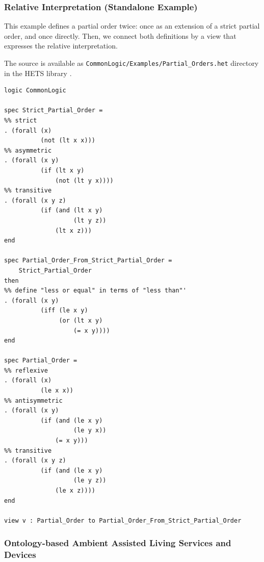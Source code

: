 \documentclass{article}
\newcommand{\normalTEXTSC}[2]{{#1\scriptsize#2}}
\newcommand     {\Hets}{\normalTEXTSC{H}{ETS}\xspace}
\begin{document}
\subsubsection{Relative Interpretation (Standalone Example)}\label{sec:rel-intpr-standalone}

This example defines a partial order twice: once as an extension of a strict partial order, and once directly.  Then, we connect both definitions by a view that expresses the relative interpretation.

The source is available as \texttt{CommonLogic/Examples/Partial\_Orders.het} directory in the \Hets library \cite{hets-library:URL}.

\begin{lstlisting}[language=hetcasl,alsolanguage=clif]
logic CommonLogic

spec Strict_Partial_Order =
%% strict
. (forall (x)
          (not (lt x x)))
%% asymmetric
. (forall (x y)
          (if (lt x y)
              (not (lt y x))))
%% transitive
. (forall (x y z)
          (if (and (lt x y)
                   (lt y z))
              (lt x z)))
end

spec Partial_Order_From_Strict_Partial_Order =
    Strict_Partial_Order
then
%% define "less or equal" in terms of "less than"'
. (forall (x y)
          (iff (le x y)
               (or (lt x y)
                   (= x y))))
end

spec Partial_Order =
%% reflexive
. (forall (x)
          (le x x))
%% antisymmetric
. (forall (x y)
          (if (and (le x y)
                   (le y x))
              (= x y)))
%% transitive
. (forall (x y z)
          (if (and (le x y)
                   (le y z))
              (le x z))))
end

view v : Partial_Order to Partial_Order_From_Strict_Partial_Order 
\end{lstlisting}

\subsubsection{Ontology-based Ambient Assisted Living Services and Devices}
\label{sec:aal-example}
\end{document}
